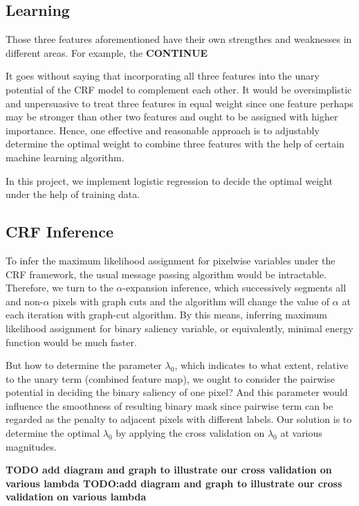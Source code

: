 \documentclass[10pt,twocolumn,letterpaper]{article}
\newcommand{\BOLD}{\textbf}
\begin{document}
\subsection{Learning}
Those three features aforementioned have their own strengthes and weaknesses in different areas. For example, the \BOLD{CONTINUE}

It goes without saying that incorporating all three features into the unary potential of the CRF model to complement each other. It would be oversimplistic and unpersuasive to treat three features in equal weight since one feature perhaps may be stronger than other two features and ought to be assigned with higher importance. Hence, one effective and reasonable approach is to adjustably determine the optimal weight to combine three features with the help of certain machine learning algorithm. 

In this project, we implement logistic regression to decide the optimal weight under the help of training data.

\subsection{CRF Inference}
To infer the maximum likelihood assignment for pixelwise variables under the CRF framework, the usual message passing algorithm would be intractable. Therefore, we turn to the $\alpha$-expansion inference,
which successively segments all and non-$\alpha$ pixels with graph cuts and the algorithm will change the value of $\alpha$ at each iteration with graph-cut algorithm. By this means, inferring maximum likelihood assignment for binary saliency variable, or equivalently, 
 minimal energy function would be much faster. 

But how to determine the parameter $\lambda_0$, which indicates to what extent, relative to the unary term (combined feature map), we ought to consider the pairwise potential in deciding the binary saliency of one pixel? And this parameter would influence the smoothness of resulting binary mask since pairwise term can be regarded as the penalty to adjacent pixels with different labels. Our solution is to determine the optimal $\lambda_0$ by applying the cross validation on $\lambda_0$ at various magnitudes. 

\BOLD{TODO add diagram and graph to illustrate our cross validation on various lambda
TODO:add diagram and graph to illustrate our cross validation on various lambda}
\end{document}
